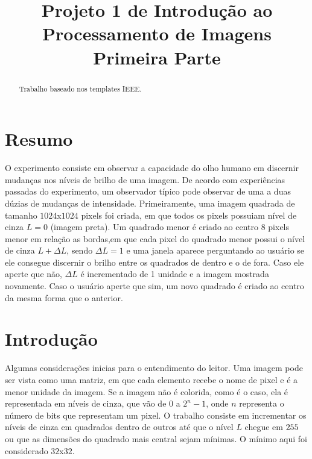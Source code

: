 \documentclass[conference]{IEEEtran}
\begin{document}
\title{Projeto 1 de Introdu\c{c}\~ao ao Processamento de Imagens \\ Primeira Parte}
\author{
}
\maketitle
\begin{abstract}
Trabalho baseado nos templates IEEE.
\end{abstract}
\section{Resumo}
\label{sec:intro} 
O experimento consiste em observar a capacidade do olho humano em discernir mudan\c{c}as nos n\'iveis de brilho de uma imagem. De acordo com experi\^encias passadas do experimento, um observador t\'ipico pode observar  de uma a duas  d\'uzias  de  mudan\c{c}as  de  intensidade. Primeiramente, uma imagem quadrada de tamanho $1024$x$1024$ pixels foi criada, em que todos os pixels possuiam n\'ivel de cinza $L=0$ (imagem preta). Um quadrado menor \'e criado ao centro 8 pixels menor em rela\c{c}\~ao as bordas,em que cada pixel do quadrado menor possui o n\'ivel de cinza $L + \Delta L$, sendo $\Delta L=1$ e uma janela aparece perguntando ao usu\'ario se ele consegue discernir o brilho entre os quadrados de dentro e o de fora. Caso ele aperte que n\~ao,  $\Delta L$ \'e incrementado de 1 unidade e a imagem mostrada novamente. Caso o usu\'ario aperte que sim, um novo quadrado \'e criado ao centro da mesma forma que o anterior.


\section{ Introdu\c{c}\~ao} 
\label{sec:meth} 
Algumas considera\c{c}\~oes inicias para o entendimento do leitor. Uma imagem pode ser vista como uma matriz, em que cada elemento recebe o nome de pixel e \'e a menor unidade da imagem. Se a imagem  n\~ao \'e colorida, como \'e o caso, ela \'e representada em n\'iveis de cinza, que v\~ao de $0$  a $ 2^n-1$, onde $n$ representa o n\'umero de bits que representam um pixel. O trabalho consiste em incrementar os n\'iveis de cinza em quadrados dentro de outros at\'e que o n\'ivel $L$ chegue em $255$ ou que as dimens\~oes do quadrado mais central sejam m\'inimas. O m\'inimo aqui foi considerado $32$x$32$.
 
\end{document}
